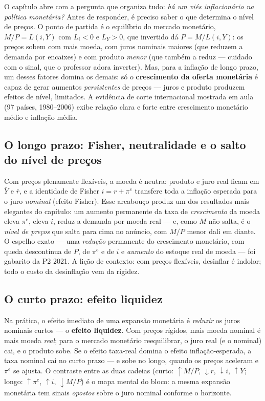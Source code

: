 \documentclass[12pt, a4paper]{article}
\begin{document}
O capítulo abre com a pergunta que organiza tudo: \emph{há um viés
inflacionário na política monetária?} Antes de responder, é preciso saber o
que determina o nível de preços. O ponto de partida é o equilíbrio do mercado
monetário, $M/P = L(i, Y)$ com $L_i<0$ e $L_Y>0$, que invertido dá
$P = M/L(i,Y)$: os preços sobem com mais moeda, com juros nominais maiores
(que reduzem a demanda por encaixes) e com produto \emph{menor} (que também a
reduz --- cuidado com o sinal, que o professor adora inverter). Mas, para a
inflação de longo prazo, um desses fatores domina os demais: só o
\textbf{crescimento da oferta monetária} é capaz de gerar aumentos
\emph{persistentes} de preços --- juros e produto produzem efeitos de nível,
limitados. A evidência de corte internacional mostrada em aula (97 países,
1980--2006) exibe relação clara e forte entre crescimento monetário médio e
inflação média.

\subsection{O longo prazo: Fisher, neutralidade e o salto do nível de preços}

Com preços plenamente flexíveis, a moeda é neutra: produto e juro real ficam
em $\bar Y$ e $\bar r$, e a identidade de Fisher $i = r + \pi^e$ transfere
toda a inflação esperada para o juro \emph{nominal} (efeito Fisher). Esse
arcabouço produz um dos resultados mais elegantes do capítulo: um aumento
permanente da taxa de \emph{crescimento} da moeda eleva $\pi^e$, eleva $i$,
reduz a demanda por moeda real --- e, como $M$ não salta, é o \emph{nível de
preços} que salta para cima no anúncio, com $M/P$ menor dali em diante. O
espelho exato --- uma \emph{redução} permanente do crescimento monetário, com
queda descontínua de $P$, de $\pi^e$ e de $i$ e \emph{aumento} do estoque real
de moeda --- foi gabarito da P2 2021. A lição de contexto: com preços
flexíveis, desinflar é indolor; todo o custo da desinflação vem da rigidez.

\subsection{O curto prazo: efeito liquidez}

Na prática, o efeito imediato de uma expansão monetária é \emph{reduzir} os
juros nominais curtos --- o \textbf{efeito liquidez}. Com preços rígidos, mais
moeda nominal é mais moeda \emph{real}; para o mercado monetário reequilibrar,
o juro real (e o nominal) cai, e o produto sobe. Se o efeito taxa-real domina
o efeito inflação-esperada, a taxa nominal cai no curto prazo --- e sobe no
longo, quando os preços aceleram e $\pi^e$ se ajusta. O contraste entre as
duas cadeias (curto: $\uparrow M/P$, $\downarrow r$, $\downarrow i$,
$\uparrow Y$; longo: $\uparrow \pi^e$, $\uparrow i$, $\downarrow M/P$) é o
mapa mental do bloco: a mesma expansão monetária tem sinais \emph{opostos}
sobre o juro nominal conforme o horizonte.
\end{document}
